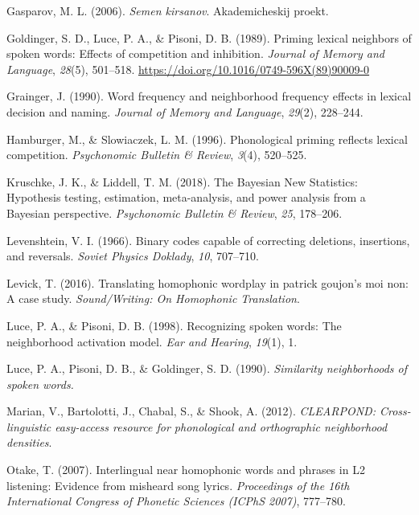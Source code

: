 \documentclass[
]{article}
\newlength{\cslhangindent}
\newenvironment{CSLReferences}[2] %
 {\begin{list}{}{%
  \setlength{\itemindent}{0pt}
  \setlength{\leftmargin}{0pt}
  \setlength{\parsep}{0pt}
  \ifodd #1
   \setlength{\leftmargin}{\cslhangindent}
   \setlength{\itemindent}{-1\cslhangindent}
  \fi
  \setlength{\itemsep}{#2\baselineskip}}}
 {\end{list}}
\begin{document}
\begin{CSLReferences}{1}{0}
Gasparov, M. L. (2006). \emph{Semen kirsanov}. Akademicheskij proekt.

Goldinger, S. D., Luce, P. A., \& Pisoni, D. B. (1989). Priming lexical
neighbors of spoken words: {Effects} of competition and inhibition.
\emph{Journal of Memory and Language}, \emph{28}(5), 501--518.
\url{https://doi.org/10.1016/0749-596X(89)90009-0}

Grainger, J. (1990). Word frequency and neighborhood frequency effects
in lexical decision and naming. \emph{Journal of Memory and Language},
\emph{29}(2), 228--244.

Hamburger, M., \& Slowiaczek, L. M. (1996). Phonological priming
reflects lexical competition. \emph{Psychonomic Bulletin \& Review},
\emph{3}(4), 520--525.

Kruschke, J. K., \& Liddell, T. M. (2018). The {Bayesian New
Statistics}: {Hypothesis} testing, estimation, meta-analysis, and power
analysis from a {Bayesian} perspective. \emph{Psychonomic Bulletin \&
Review}, \emph{25}, 178--206.

Levenshtein, V. I. (1966). Binary codes capable of correcting deletions,
insertions, and reversals. \emph{Soviet Physics Doklady}, \emph{10},
707--710.

Levick, T. (2016). Translating homophonic wordplay in patrick goujon's
moi non: A case study. \emph{Sound/Writing: On Homophonic Translation}.

Luce, P. A., \& Pisoni, D. B. (1998). Recognizing spoken words: {The}
neighborhood activation model. \emph{Ear and Hearing}, \emph{19}(1), 1.

Luce, P. A., Pisoni, D. B., \& Goldinger, S. D. (1990). \emph{Similarity
neighborhoods of spoken words.}

Marian, V., Bartolotti, J., Chabal, S., \& Shook, A. (2012).
\emph{{CLEARPOND}: {Cross-linguistic} easy-access resource for
phonological and orthographic neighborhood densities}.

Otake, T. (2007). Interlingual near homophonic words and phrases in L2
listening: Evidence from misheard song lyrics. \emph{Proceedings of the
16th International Congress of Phonetic Sciences (ICPhS 2007)},
777--780.


\end{CSLReferences}
\end{document}
